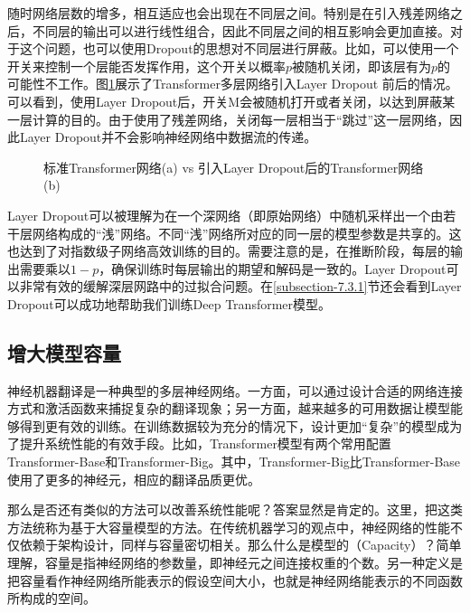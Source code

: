 \parinterval 随时网络层数的增多，相互适应也会出现在不同层之间。特别是在引入残差网络之后，不同层的输出可以进行线性组合，因此不同层之间的相互影响会更加直接。对于这个问题，也可以使用Dropout的思想对不同层进行屏蔽。比如，可以使用一个开关来控制一个层能否发挥作用，这个开关以概率$p$被随机关闭，即该层有为$p$的可能性不工作。图\ref{fig:7-15}展示了Transformer多层网络引入Layer Dropout 前后的情况。可以看到，使用Layer Dropout后，开关M会被随机打开或者关闭，以达到屏蔽某一层计算的目的。由于使用了残差网络，关闭每一层相当于``跳过''这一层网络，因此Layer Dropout并不会影响神经网络中数据流的传递。

\begin{figure}[htp]
\centering

\caption{标准Transformer网络(a)  vs 引入Layer Dropout后的Transformer网络(b)}
\label{fig:7-15}
\end{figure}

\parinterval Layer Dropout可以被理解为在一个深网络（即原始网络）中随机采样出一个由若干层网络构成的``浅''网络。不同``浅''网络所对应的同一层的模型参数是共享的。这也达到了对指数级子网络高效训练的目的。需要注意的是，在推断阶段，每层的输出需要乘以$1-p$，确保训练时每层输出的期望和解码是一致的。Layer Dropout可以非常有效的缓解深层网路中的过拟合问题。在\ref{subsection-7.3.1}节还会看到Layer Dropout可以成功地帮助我们训练Deep Transformer模型。

\vspace{-0.5em}
\subsection{增大模型容量}
\label{subsection-7.3.2}

\parinterval 神经机器翻译是一种典型的多层神经网络。一方面，可以通过设计合适的网络连接方式和激活函数来捕捉复杂的翻译现象；另一方面，越来越多的可用数据让模型能够得到更有效的训练。在训练数据较为充分的情况下，设计更加``复杂''的模型成为了提升系统性能的有效手段。比如，Transformer模型有两个常用配置Transformer-Base和Transformer-Big。其中，Transformer-Big比Transformer-Base使用了更多的神经元，相应的翻译品质更优\cite{NIPS2017_7181}。

\parinterval 那么是否还有类似的方法可以改善系统性能呢？答案显然是肯定的。这里，把这类方法统称为基于大容量模型的方法。在传统机器学习的观点中，神经网络的性能不仅依赖于架构设计，同样与容量密切相关。那么什么是模型的{\small{}}（Capacity）？简单理解，容量是指神经网络的参数量，即神经元之间连接权重的个数。另一种定义是把容量看作神经网络所能表示的假设空间大小\cite{DBLP:journals/nature/LeCunBH15}，也就是神经网络能表示的不同函数所构成的空间。

